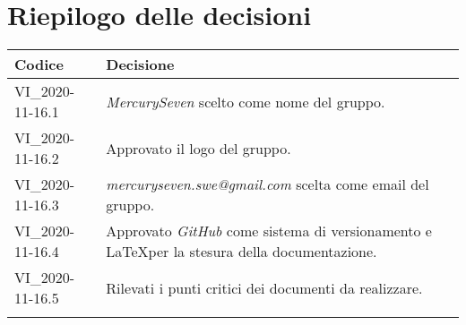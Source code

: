 \section{Riepilogo delle decisioni \hfil}
{
	\setlength{\freewidth}{\dimexpr\textwidth-4\tabcolsep}
	\renewcommand{\arraystretch}{1.5}
	\setlength{\aboverulesep}{0pt}
	\setlength{\belowrulesep}{0pt}
	\begin{longtable}{L{.3\freewidth} L{.7\freewidth}}
		\toprule 
		\textbf{Codice} & \textbf{Decisione}\\
		\toprule
		\endhead
		
		VI\_2020-11-16.1 & \textit{MercurySeven} scelto come nome del gruppo. \\  
		VI\_2020-11-16.2 & Approvato il logo del gruppo. \\ 
		VI\_2020-11-16.3 & \textit{mercuryseven.swe@gmail.com} scelta come email del gruppo. \\
		VI\_2020-11-16.4 & Approvato \textit{GitHub} come sistema di versionamento e \LaTeX per la stesura della documentazione. \\  
		VI\_2020-11-16.5 & Rilevati i punti critici dei documenti da realizzare. \\
		
		
		\bottomrule
		\hiderowcolors
	\end{longtable}
}
